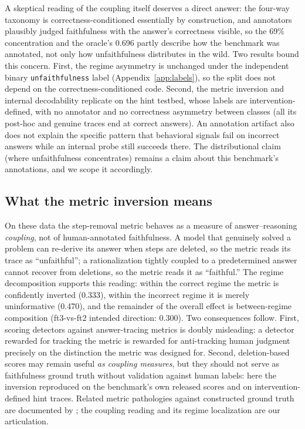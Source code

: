 \documentclass{article}
\begin{document}
A skeptical reading of the coupling itself deserves a direct answer: the four-way taxonomy is correctness-conditioned essentially by construction, and annotators plausibly judged faithfulness with the answer's correctness visible, so the 69\% concentration and the oracle's 0.696 partly describe how the benchmark was annotated, not only how unfaithfulness distributes in the wild. Two results bound this concern. First, the regime asymmetry is unchanged under the independent binary \texttt{unfaithfulness} label (Appendix~\ref{app:labels}), so the split does not depend on the correctness-conditioned code. Second, the metric inversion and internal decodability replicate on the hint testbed, whose labels are intervention-defined, with no annotator and no correctness asymmetry between classes (all its post-hoc and genuine traces end at correct answers). An annotation artifact also does not explain the specific pattern that behavioral signals fail on incorrect answers while an internal probe still succeeds there. The distributional claim (where unfaithfulness concentrates) remains a claim about this benchmark's annotations, and we scope it accordingly.

\subsection{What the metric inversion means}
On these data the step-removal metric behaves as a measure of answer--reasoning \emph{coupling}, not of human-annotated faithfulness. A model that genuinely solved a problem can re-derive its answer when steps are deleted, so the metric reads its trace as ``unfaithful''; a rationalization tightly coupled to a predetermined answer cannot recover from deletions, so the metric reads it as ``faithful.'' The regime decomposition supports this reading: within the correct regime the metric is confidently inverted (0.333), within the incorrect regime it is merely uninformative (0.470), and the remainder of the overall effect is between-regime composition (ft3-vs-ft2 intended direction: 0.300). Two consequences follow. First, scoring detectors against answer-tracing metrics is doubly misleading: a detector rewarded for tracking the metric is rewarded for anti-tracking human judgment precisely on the distinction the metric was designed for. Second, deletion-based scores may remain useful \emph{as coupling measures}, but they should not serve as faithfulness ground truth without validation against human labels: here the inversion reproduced on the benchmark's own released scores and on intervention-defined hint traces. Related metric pathologies against constructed ground truth are documented by \citet{gurarieh2026bonafide}; the coupling reading and its regime localization are our articulation.
\end{document}
